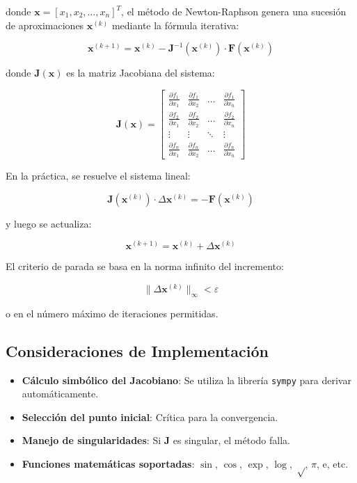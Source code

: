 \documentclass[12pt, letterpaper]{article}
\begin{document}
donde $\mathbf{x} = [x_1, x_2, \dots, x_n]^T$, el método de Newton-Raphson genera una sucesión de aproximaciones $\mathbf{x}^{(k)}$ mediante la fórmula iterativa:

\[
\mathbf{x}^{(k+1)} = \mathbf{x}^{(k)} - \mathbf{J}^{-1}(\mathbf{x}^{(k)}) \cdot \mathbf{F}(\mathbf{x}^{(k)})
\]

donde $\mathbf{J}(\mathbf{x})$ es la matriz Jacobiana del sistema:

\[
\mathbf{J}(\mathbf{x}) = 
\begin{bmatrix}
\frac{\partial f_1}{\partial x_1} & \frac{\partial f_1}{\partial x_2} & \dots & \frac{\partial f_1}{\partial x_n} \\
\frac{\partial f_2}{\partial x_1} & \frac{\partial f_2}{\partial x_2} & \dots & \frac{\partial f_2}{\partial x_n} \\
\vdots & \vdots & \ddots & \vdots \\
\frac{\partial f_n}{\partial x_1} & \frac{\partial f_n}{\partial x_2} & \dots & \frac{\partial f_n}{\partial x_n}
\end{bmatrix}
\]

En la práctica, se resuelve el sistema lineal:

\[
\mathbf{J}(\mathbf{x}^{(k)}) \cdot \Delta\mathbf{x}^{(k)} = -\mathbf{F}(\mathbf{x}^{(k)})
\]

y luego se actualiza:

\[
\mathbf{x}^{(k+1)} = \mathbf{x}^{(k)} + \Delta\mathbf{x}^{(k)}
\]

El criterio de parada se basa en la norma infinito del incremento:

\[
\|\Delta\mathbf{x}^{(k)}\|_\infty < \varepsilon
\]

o en el número máximo de iteraciones permitidas.

\subsection{Consideraciones de Implementación}
\begin{itemize}
    \item \textbf{Cálculo simbólico del Jacobiano}: Se utiliza la librería \texttt{sympy} para derivar automáticamente.
    \item \textbf{Selección del punto inicial}: Crítica para la convergencia.
    \item \textbf{Manejo de singularidades}: Si $\mathbf{J}$ es singular, el método falla.
    \item \textbf{Funciones matemáticas soportadas}: $\sin$, $\cos$, $\exp$, $\log$, $\sqrt$, $\pi$, e, etc.
\end{itemize}
\end{document}
